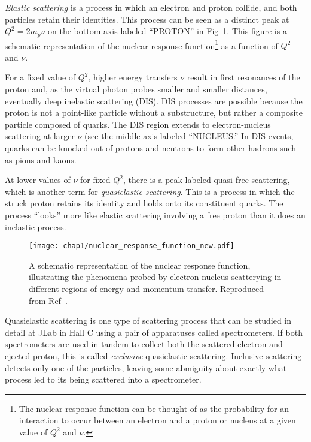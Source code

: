 \textit{Elastic scattering} is a process in which an electron and proton
collide, and both particles retain their identities.
This process can be seen as a distinct peak at $Q^2=2m_p\nu$ on the bottom axis
labeled ``PROTON'' in Fig~\ref{fig:nuclear_response_function}.
This figure is a schematic representation of the nuclear response
function\footnote{The nuclear response function can be thought of as the
probability for an interaction to occur between an electron and a proton or
nucleus at a given value of $Q^2$ and $\nu$.} as a function of $Q^2$ and $\nu$.

For a fixed value of $Q^2$, higher energy transfers $\nu$ result in first
resonances of the proton and, as the virtual photon probes smaller and
smaller distances, eventually deep inelastic scattering (DIS).
DIS processes are possible because the proton is not a point-like particle
without a substructure, but rather a composite particle composed of quarks.
The DIS region extends to electron-nucleus scattering at larger $\nu$ (see the
middle axis labeled ``NUCLEUS.''
In DIS events, quarks can be knocked out of protons and neutrons to form other
hadrons such as pions and kaons.

At lower values of $\nu$ for fixed $Q^2$, there is a peak labeled
quasi-free scattering, which is another term for \textit{quasielastic
scattering}.
This is a process in which the struck proton retains its identity and holds
onto its constituent quarks.
The process ``looks'' more like elastic scattering involving a free proton than
it does an inelastic process.

\begin{figure}[!h]
    \centering
    \texttt{[image: chap1/nuclear\_response\_function\_new.pdf]}
    \caption[Schematic representation of the nuclear response function.]{
             A schematic representation of the nuclear response function,
             illustrating the phenomena probed by electron-nucleus scatterying
             in different regions of energy and momentum transfer.
             Reproduced from Ref~\cite{Frois_1985}.
            }
    \label{fig:nuclear_response_function}
\end{figure}

Quasielastic scattering is one type of scattering process that can be studied
in detail at JLab in Hall C using a pair of apparatuses called spectrometers.
If both spectrometers are used in tandem to collect both the scattered electron
and ejected proton, this is called \textit{exclusive} quasielastic scattering.
Inclusive scattering detects only one of the particles, leaving some abmiguity
about exactly what process led to its being scattered into a spectrometer.


